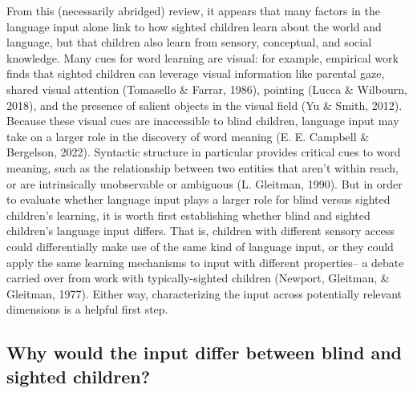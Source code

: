 \documentclass[
  man,floatsintext]{apa6}
\begin{document}
From this (necessarily abridged) review, it appears that many factors in the language input alone link to how sighted children learn about the world and language, but that children also learn from sensory, conceptual, and social knowledge. Many cues for word learning are visual: for example, empirical work finds that sighted children can leverage visual information like parental gaze, shared visual attention (Tomasello \& Farrar, 1986), pointing (Lucca \& Wilbourn, 2018), and the presence of salient objects in the visual field (Yu \& Smith, 2012). Because these visual cues are inaccessible to blind children, language input may take on a larger role in the discovery of word meaning (E. E. Campbell \& Bergelson, 2022). Syntactic structure in particular provides critical cues to word meaning, such as the relationship between two entities that aren't within reach, or are intrinsically unobservable or ambiguous (L. Gleitman, 1990). But in order to evaluate whether language input plays a larger role for blind versus sighted children's learning, it is worth first establishing whether blind and sighted children's language input differs. That is, children with different sensory access could differentially make use of the same kind of language input, or they could apply the same learning mechanisms to input with different properties-- a debate carried over from work with typically-sighted children (Newport, Gleitman, \& Gleitman, 1977). Either way, characterizing the input across potentially relevant dimensions is a helpful first step.

\hypertarget{why-would-the-input-differ-between-blind-and-sighted-children}{%
\subsection{Why would the input differ between blind and sighted children?}\label{why-would-the-input-differ-between-blind-and-sighted-children}}
\end{document}
